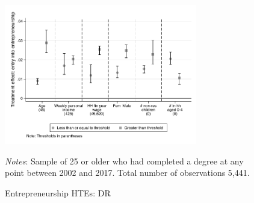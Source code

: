\documentclass[12pt, a4paper]{article}
\begin{document}

%

\begin{figure}[H]
\centering
\caption{Entrepreneurship HTEs: DR}
\vspace{0.5cm}
  \label{fig:htedrent}
    \includegraphics[width=0.75\textwidth]{_figures/hte_entrepreneur_G_100_DR.pdf}
\parbox{1\textwidth}{\footnotesize{\textit{Notes}: Sample of 25 or older who had completed a degree at any point between 2002 and 2017. Total number of observations 5,441.}}
\end{figure}
\end{document}
